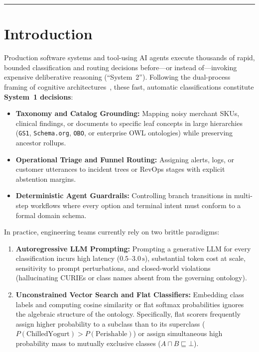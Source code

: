 \documentclass[11pt,a4paper]{article}
\begin{document}
\vspace{0.5em}
\hrule
\vspace{1em}

\section{Introduction}

Production software systems and tool-using AI agents execute thousands of rapid, bounded classification and routing decisions before---or instead of---invoking expensive deliberative reasoning (``System~2''). Following the dual-process framing of cognitive architectures~\cite{kahneman2011thinking}, these fast, automatic classifications constitute \textbf{System~1 decisions}:
\begin{itemize}[leftmargin=1.8em,itemsep=0.25em]
  \item \textbf{Taxonomy and Catalog Grounding:} Mapping noisy merchant SKUs, clinical findings, or documents to specific leaf concepts in large hierarchies (\texttt{GS1}, \texttt{Schema.org}, \texttt{OBO}, or enterprise OWL ontologies) while preserving ancestor rollups.
  \item \textbf{Operational Triage and Funnel Routing:} Assigning alerts, logs, or customer utterances to incident trees or RevOps stages with explicit abstention margins.
  \item \textbf{Deterministic Agent Guardrails:} Controlling branch transitions in multi-step workflows where every option and terminal intent must conform to a formal domain schema.
\end{itemize}

In practice, engineering teams currently rely on two brittle paradigms:
\begin{enumerate}[leftmargin=1.8em,itemsep=0.25em]
  \item \textbf{Autoregressive LLM Prompting:} Prompting a generative LLM for every classification incurs high latency ($0.5\text{--}3.0\,\text{s}$), substantial token cost at scale, sensitivity to prompt perturbations, and closed-world violations (hallucinating CURIEs or class names absent from the governing ontology).
  \item \textbf{Unconstrained Vector Search and Flat Classifiers:} Embedding class labels and computing cosine similarity or flat softmax probabilities ignores the algebraic structure of the ontology. Specifically, flat scorers frequently assign higher probability to a subclass than to its superclass ($P(\text{ChilledYogurt}) > P(\text{Perishable})$) or assign simultaneous high probability mass to mutually exclusive classes ($A \sqcap B \sqsubseteq \bot$).
\end{enumerate}
\end{document}

